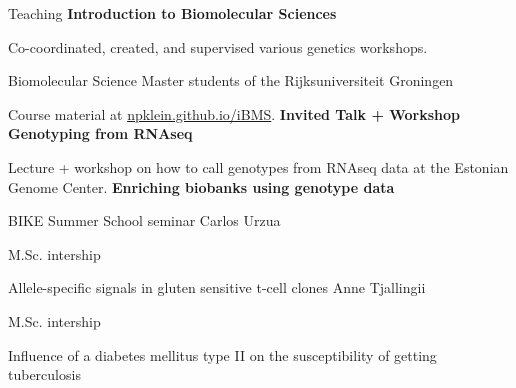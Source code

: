 \begin{rubric}{Teaching}
%
%
%
	\textbf{Introduction to Biomolecular Sciences} \par
	 Co-coordinated, created, and supervised various genetics workshops. \par
	 Biomolecular Science Master students of the Rijksuniversiteit Groningen \par
	 Course material at \url{npklein.github.io/iBMS}.
%
\entry*[26 Aug 2016]%
\textbf{Invited Talk + Workshop Genotyping from RNAseq} \par
Lecture + workshop on how to call genotypes from RNAseq data at the Estonian Genome Center.
%
\entry*[22 Jun 2016]%
\textbf{Enriching biobanks using genotype data} \par
BIKE Summer School seminar
%
%
Carlos Urzua \par
M.Sc. intership \par
Allele-specific signals in gluten sensitive t-cell clones
%
%
Anne Tjallingii \par
M.Sc. intership \par
Influence of a diabetes mellitus type II on the susceptibility of getting tuberculosis
\end{rubric}